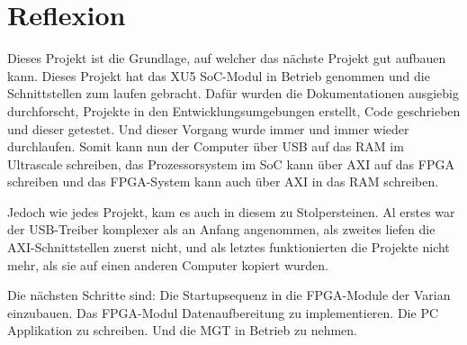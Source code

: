 \section{Reflexion}
Dieses Projekt ist die Grundlage, auf welcher das nächste Projekt gut aufbauen kann. Dieses Projekt hat das XU5 SoC-Modul in Betrieb genommen und die Schnittstellen zum laufen gebracht. Dafür wurden die Dokumentationen ausgiebig durchforscht, Projekte in den Entwicklungsumgebungen erstellt, Code geschrieben und dieser getestet. Und dieser Vorgang wurde immer und immer wieder durchlaufen. Somit kann nun der Computer über USB auf das RAM im Ultrascale schreiben, das Prozessorsystem im SoC kann über AXI auf das FPGA schreiben und das FPGA-System kann auch über AXI in das RAM schreiben.

Jedoch wie jedes Projekt, kam es auch in diesem zu Stolpersteinen. Al erstes war der USB-Treiber komplexer als an Anfang angenommen, als zweites liefen die AXI-Schnittstellen zuerst nicht, und als letztes funktionierten die Projekte nicht mehr, als sie auf einen anderen Computer kopiert wurden.

Die nächsten Schritte sind: Die Startupsequenz in die FPGA-Module der Varian einzubauen. Das FPGA-Modul Datenaufbereitung zu implementieren. Die PC Applikation zu schreiben. Und die MGT in Betrieb zu nehmen.
